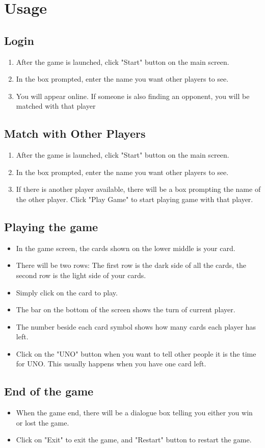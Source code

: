 \documentclass[12pt, titlepage]{article}
\begin{document}
\section{Usage}
\subsection{Login}
\begin{enumerate}
    \item After the game is launched, click "Start" button on the main screen.
    \item In the box prompted, enter the name you want other players to see.
    \item You will appear online. If someone is also finding an opponent, you will be matched with that player
\end{enumerate}

\subsection{Match with Other Players}
\begin{enumerate}
    \item After the game is launched, click "Start" button on the main screen.
    \item In the box prompted, enter the name you want other players to see.
    \item If there is another player available, there will be a box prompting the name of the other player. Click "Play Game" to start playing game with that player.
\end{enumerate}

\subsection{Playing the game}
\begin{itemize}
    \item In the game screen, the cards shown on the lower middle is your card.
    \item There will be two rows: The first row is the dark side of all the cards, the second row is the light side of your cards.
    \item Simply click on the card to play.
    \item The bar on the bottom of the screen shows the turn of current player.
    \item The number beside each card symbol shows how many cards each player has left.
    \item Click on the "UNO" button when you want to tell other people it is the time for UNO. This usually happens when you have one card left.
\end{itemize}

\subsection{End of the game}
\begin{itemize}
    \item When the game end, there will be a dialogue box telling you either you win or lost the game.
    \item Click on "Exit" to exit the game, and "Restart" button to restart the game.
\end{itemize}
\end{document}
